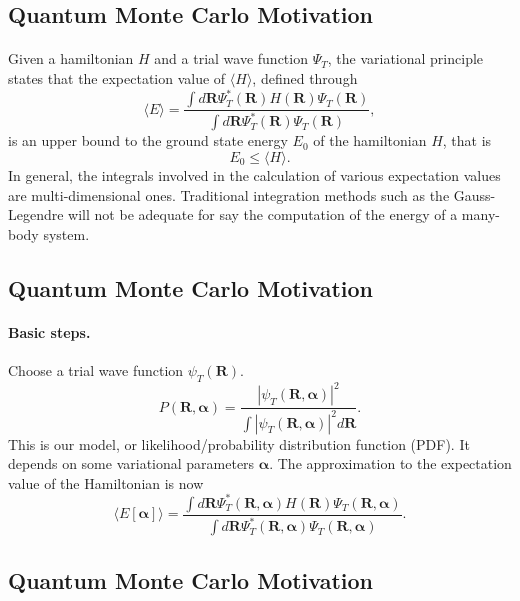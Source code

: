 \documentclass[%
oneside,                 %
final,                   %
10pt]{article}
\begin{document}
\subsection{Quantum Monte Carlo Motivation}

\paragraph{}
Given a hamiltonian $H$ and a trial wave function $\Psi_T$, the variational principle states that the expectation value of $\langle H \rangle$, defined through 
\[
   \langle E \rangle =
   \frac{\int d\bm{R}\Psi^{\ast}_T(\bm{R})H(\bm{R})\Psi_T(\bm{R})}
        {\int d\bm{R}\Psi^{\ast}_T(\bm{R})\Psi_T(\bm{R})},
\]
is an upper bound to the ground state energy $E_0$ of the hamiltonian $H$, that is 
\[
    E_0 \le \langle H \rangle .
\]
In general, the integrals involved in the calculation of various  expectation values  are multi-dimensional ones. Traditional integration methods such as the Gauss-Legendre will not be adequate for say the  computation of the energy of a many-body system.




\subsection{Quantum Monte Carlo Motivation}

\paragraph{Basic steps.}
Choose a trial wave function
$\psi_T(\bm{R})$.
\[
   P(\bm{R},\bm{\alpha})= \frac{\left|\psi_T(\bm{R},\bm{\alpha})\right|^2}{\int \left|\psi_T(\bm{R},\bm{\alpha})\right|^2d\bm{R}}.
\]
This is our model, or likelihood/probability distribution function  (PDF). It depends on some variational parameters $\bm{\alpha}$.
The approximation to the expectation value of the Hamiltonian is now 
\[
   \langle E[\bm{\alpha}] \rangle = 
   \frac{\int d\bm{R}\Psi^{\ast}_T(\bm{R},\bm{\alpha})H(\bm{R})\Psi_T(\bm{R},\bm{\alpha})}
        {\int d\bm{R}\Psi^{\ast}_T(\bm{R},\bm{\alpha})\Psi_T(\bm{R},\bm{\alpha})}.
\]




\subsection{Quantum Monte Carlo Motivation}
\end{document}
